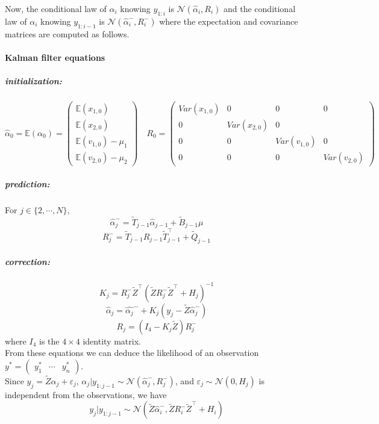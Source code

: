 \documentclass[11pt]{article}
\newcommand {\1}{\mathbb{1}}
\begin{document}
Now, the conditional law of $\alpha_i$ knowing $y_{1:i}$ is $\mathcal{N}(\hat{\alpha}_i,R_i)$ and the conditional law of $\alpha_i$ knowing $y_{1:i-1}$ is $\mathcal{N}(\hat{\alpha}_i^-,R_i^-)$ where the expectation and covariance matrices are computed as follows.

\paragraph{Kalman filter equations}
\subparagraph{initialization:}
\[\hat{\alpha}_0=\mathbb{E}(\alpha_0)=\begin{pmatrix} \mathbb{E}(x_{1,0}) \\ \mathbb{E}(x_{2,0})  \\ \mathbb{E}(v_{1,0})-\mu_1 \\ \mathbb{E}(v_{2,0})-\mu_2\end{pmatrix} \quad R_0=\begin{pmatrix} Var(x_{1,0}) & 0 & 0 & 0 \\ 0 & Var(x_{2,0})  & 0 \\ 0 & 0 & Var(v_{1,0}) & 0 \\ 0 & 0 & 0 & Var(v_{2,0}) \end{pmatrix}\]
\subparagraph{prediction:}
For $j \in \{2,\cdots,N\}$,
\[\hat{\alpha}_j^-=\tilde{T}_{j-1} \hat{\alpha}_{j-1}+ \tilde{B}_{j-1} \mu\]
\[ R_j^{-} = \tilde{T}_{j-1} R_{j-1} \tilde{T}_{j-1}^\top + \tilde{Q}_{j-1}\]
\subparagraph{correction:}
\[K_j=R_j^- \tilde{Z}^\top \left( \tilde{Z} R_j^- \tilde{Z}^\top +H_j\right)^{-1} \]
\[\hat{\alpha}_j=\hat{\alpha_j}^{-}+K_j \left( y_j-\tilde{Z} \hat{\alpha}_j^-\right)\]
\[R_j=\left(I_4-K_j \tilde{Z} \right) R_j^-\]
where $I_4$ is the $4 \times 4$ identity matrix. \\

From these equations we can deduce the likelihood of an observation $y^*=\begin{pmatrix} y_1^* &\cdots& y_n^* \end{pmatrix}$.\\
Since $y_j=\tilde{Z}\alpha_j+\varepsilon_j$,  $\alpha_j \vert y_{1:j-1} \sim \mathcal{N}(\hat{\alpha}_j^-,R_j^-)$, and $\varepsilon_j \sim \mathcal{N}(0,H_j)$ is independent from the observations, we have
\[y_j \vert y_{1:j-1} \sim \mathcal{N}\left(\tilde{Z} \hat{\alpha}_i^-,\tilde{Z} R_i^- \tilde{Z}^\top+H_i \right)\]
\end{document}

